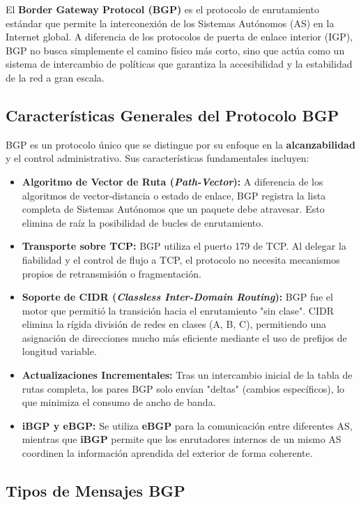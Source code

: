 El \textbf{Border Gateway Protocol (BGP)} es el protocolo de enrutamiento estándar que permite la interconexión de los Sistemas Autónomos (AS) en la Internet global. A diferencia de los protocolos de puerta de enlace interior (IGP), BGP no busca simplemente el camino físico más corto, sino que actúa como un sistema de intercambio de políticas que garantiza la accesibilidad y la estabilidad de la red a gran escala.

\subsection{Características Generales del Protocolo BGP}

BGP es un protocolo único que se distingue por su enfoque en la \textbf{alcanzabilidad} y el control administrativo. Sus características fundamentales incluyen:

\begin{itemize}
	\item \textbf{Algoritmo de Vector de Ruta (\textit{Path-Vector}):} A diferencia de los algoritmos de vector-distancia o estado de enlace, BGP registra la lista completa de Sistemas Autónomos que un paquete debe atravesar. Esto elimina de raíz la posibilidad de bucles de enrutamiento.
	\item \textbf{Transporte sobre TCP:} BGP utiliza el puerto 179 de TCP. Al delegar la fiabilidad y el control de flujo a TCP, el protocolo no necesita mecanismos propios de retransmisión o fragmentación.
	\item \textbf{Soporte de CIDR (\textit{Classless Inter-Domain Routing}):} BGP fue el motor que permitió la transición hacia el enrutamiento "sin clase". CIDR elimina la rígida división de redes en clases (A, B, C), permitiendo una asignación de direcciones mucho más eficiente mediante el uso de prefijos de longitud variable.
	\item \textbf{Actualizaciones Incrementales:} Tras un intercambio inicial de la tabla de rutas completa, los pares BGP solo envían "deltas" (cambios específicos), lo que minimiza el consumo de ancho de banda.
	\item \textbf{iBGP y eBGP:} Se utiliza \textbf{eBGP} para la comunicación entre diferentes AS, mientras que \textbf{iBGP} permite que los enrutadores internos de un mismo AS coordinen la información aprendida del exterior de forma coherente.
\end{itemize} 

\subsection{Tipos de Mensajes BGP}

